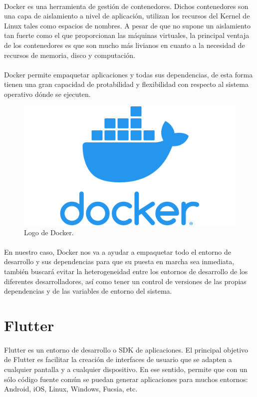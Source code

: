 \paragraph{}Docker es una herramienta de gestión de contenedores. Dichos contenedores son
una capa de aislamiento a nivel de aplicación, utilizan los recursos del Kernel de Linux
tales como espacios de nombres. A pesar de que no supone un aislamiento tan fuerte como
el que proporcionan las máquinas virtuales, la principal ventaja de los contenedores es
que son mucho más livianos en cuanto a la necesidad de recursos de memoria, disco y computación.
\cite{docker}

\paragraph{} Docker permite empaquetar aplicaciones y todas sus dependencias, de esta
forma tienen una gran capacidad de protabilidad y flexibilidad con respecto al sistema
operativo dónde se ejecuten.

\begin{figure}[H]
	\centering
	\includegraphics[width=0.50\linewidth]{imgs/docker-logo}
	\caption[Docker Logo]{Logo de Docker.}
	\label{fig:docker}
\end{figure}

\paragraph{} En nuestro caso, Docker nos va a ayudar a empaquetar todo el entorno de
desarrollo y sus dependencias para que su puesta en marcha sea inmediata, también buscará
evitar la heterogeneidad entre los entornos de desarrollo de los diferentes desarrolladores,
así como tener un control de versiones de las propias dependencias y de las variables
de entorno del sistema.

\section{Flutter}\label{sec:flutter}

\paragraph{} Flutter es un entorno de desarrollo o \gls{SDK} de aplicaciones. El principal
objetivo de Flutter es facilitar la creación de interfaces de usuario que se adapten a
cualquier pantalla y a cualquier dispositivo. En ese sentido, permite que con un sólo
código fuente común se puedan generar aplicaciones para muchos entornos: Android, iOS,
Linux, Windows, Fucsia, etc.
\cite{flutter}

